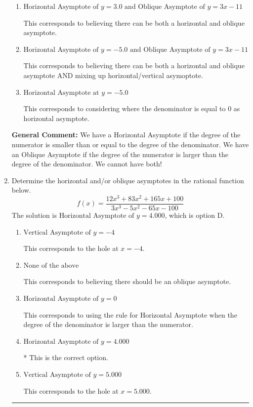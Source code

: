 \documentclass{extbook}[14pt]
\newcommand{\litem}[1]{\item #1

\rule{\textwidth}{0.4pt}}
\begin{document}
\begin{enumerate}
{\begin{enumerate}[label=\Alph*.]
This corresponds to using rule for Horizontal Asymptote when degree of numerator and denominator match.
\item \( \text{Horizontal Asymptote of } y = 3.0 \text{ and Oblique Asymptote of } y = 3x -11 \)

This corresponds to believing there can be both a horizontal and oblique asymptote.
\item \( \text{Horizontal Asymptote of } y = -5.0 \text{ and Oblique Asymptote of } y = 3x -11 \)

This corresponds to believing there can be both a horizontal and oblique asymptote AND mixing up horizontal/vertical asymoptote.
\item \( \text{Horizontal Asymptote at } y = -5.0 \)

This corresponds to considering where the denominator is equal to 0 as horizontal asymptote.
\end{enumerate}

\textbf{General Comment:} We have a Horizontal Asymptote if the degree of the numerator is smaller than or equal to the degree of the denominator. We have an Oblique Asymptote if the degree of the numerator is larger than the degree of the denominator. We cannot have both!
}
\litem{
Determine the horizontal and/or oblique asymptotes in the rational function below.
\[ f(x) = \frac{12x^{3} +83 x^{2} +165 x + 100}{3x^{3} -5 x^{2} -65 x -100} \]The solution is \( \text{Horizontal Asymptote of } y = 4.000  \), which is option D.\begin{enumerate}[label=\Alph*.]
\item \( \text{Vertical Asymptote of } y = -4  \)

This corresponds to the hole at $x = -4$.
\item \( \text{None of the above} \)

This corresponds to believing there should be an oblique asymptote.
\item \( \text{Horizontal Asymptote of } y = 0  \)

This corresponds to using the rule for Horizontal Asymptote when the degree of the denominator is larger than the numerator.
\item \( \text{Horizontal Asymptote of } y = 4.000  \)

* This is the correct option.
\item \( \text{Vertical Asymptote of } y = 5.000  \)

This corresponds to the hole at $x = 5.000$.
\end{enumerate}

}
\end{enumerate}
\end{document}
